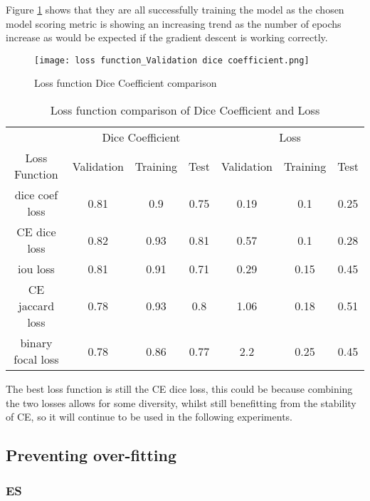 Figure \ref{loss_dice} shows that they are all successfully training the model as the chosen model scoring metric is showing an increasing trend as the number of epochs increase as would be expected if the gradient descent is working correctly.

\begin{figure}[hbt!]
    \centering
    \texttt{[image: loss function\_Validation dice coefficient.png]}
    \caption{Loss function Dice Coefficient comparison}
    \label{loss_dice}
\end{figure}

\begin{table}[ht!] 
    \begin{center}
    \begin{tabular}{ccccccc} 
    \toprule
       & \multicolumn{3}{c}{Dice Coefficient}     & \multicolumn{3}{c}{Loss} \\
    Loss Function & Validation & Training & Test & Validation & Training & Test \\ 
    \midrule
    dice coef loss & 0.81 & 0.9 & 0.75 & 0.19 & 0.1 & 0.25  \\ \rowcolor{lightgray} \gls{CE} dice loss & 0.82 & 0.93 & 0.81 & 0.57 & 0.1 & 0.28  \\ iou loss & 0.81 & 0.91 & 0.71 & 0.29 & 0.15 & 0.45  \\ \gls{CE} jaccard loss & 0.78 & 0.93 & 0.8 & 1.06 & 0.18 & 0.51  \\ binary focal loss & 0.78 & 0.86 & 0.77 & 2.2 & 0.25 & 0.45  \\
    \bottomrule
    \end{tabular}
  \end{center} 
  \caption{Loss function comparison of Dice Coefficient and Loss}\label{tab_loss}
\end{table}

The best loss function is still the \gls{CE} dice loss, this could be because combining the two losses allows for some diversity, whilst still benefitting from the stability of \gls{CE}, so it will continue to be used in the following experiments.

\subsection{Preventing over-fitting} \label{regularisation_sec}
\subsubsection{\gls{ES}}

